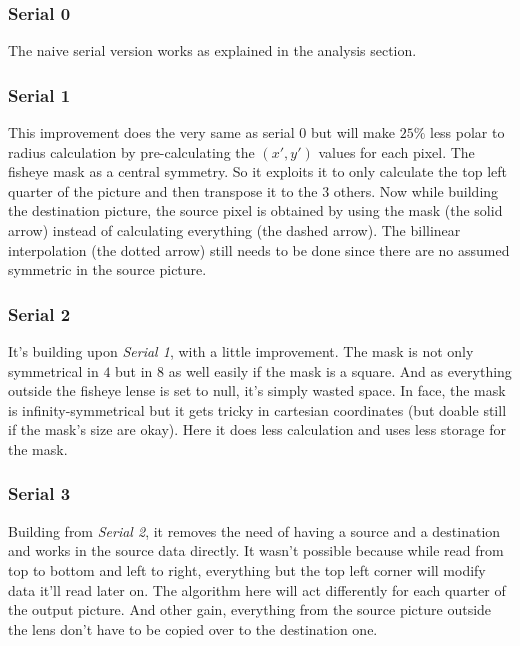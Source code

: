 \documentclass[10pt,a4paper]{article}
\begin{document}
\subsubsection{Serial 0}

The naive serial version works as explained in the analysis section.

\subsubsection{Serial 1}

This improvement does the very same as serial 0 but will make $25\%$ less polar
to radius calculation by pre-calculating the $(x\prime,y\prime)$ values for
each pixel. The fisheye mask as a central symmetry. So it exploits it to only
calculate the top left quarter of the picture and then transpose it to the $3$
others. Now while building the destination picture, the source pixel is
obtained by using the mask (the solid arrow) instead of calculating everything
(the dashed arrow).  The billinear interpolation (the dotted arrow) still needs
to be done since there are no assumed symmetric in the source picture.

\subsubsection{Serial 2}

It’s building upon \emph{Serial 1}, with a little improvement. The mask is not
only symmetrical in $4$ but in $8$ as well easily if the mask is a square. And
as everything outside the fisheye lense is set to null, it’s simply wasted
space. In face, the mask is infinity-symmetrical but it gets tricky in
cartesian coordinates (but doable still if the mask’s size are okay). Here it
does less calculation and uses less storage for the mask.

\subsubsection{Serial 3}

Building from \emph{Serial 2}, it removes the need of having a source and a
destination and works in the source data directly. It wasn’t possible because
while read from top to bottom and left to right, everything but the top left
corner will modify data it’ll read later on. The algorithm here will act
differently for each quarter of the output picture. And other gain, everything
from the source picture outside the lens don’t have to be copied over to the
destination one.
\end{document}
